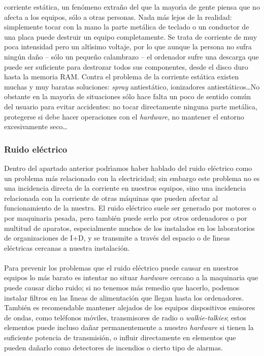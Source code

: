 corriente est\'atica, un fen\'omeno extra\~no del que la mayor\'{\i}a de gente
piensa que no afecta a los equipos, s\'olo a otras personas. Nada m\'as lejos
de la realidad: simplemente tocar con la mano la parte met\'alica de teclado o 
un conductor de una placa puede destruir un equipo completamente. Se trata de
corriente de muy poca intensidad pero un alt\'{\i}simo voltaje, por lo que 
aunque la persona no sufra ning\'un da\~no -- s\'olo un peque\~no calambrazo --
el ordenador sufre una descarga que puede ser suficiente para destrozar todos
sus componentes, desde el disco duro hasta la memoria RAM. Contra el problema
de la corriente est\'atica existen muchas y muy baratas soluciones: {\it spray}
antiest\'atico, ionizadores antiest\'aticos\ldots No obstante en la mayor\'{\i}a
de situaciones s\'olo hace falta un poco de sentido com\'un del usuario para
evitar accidentes: no tocar directamente ninguna parte met\'alica, protegerse
si debe hacer operaciones con el {\it hardware}, no mantener el entorno 
excesivamente seco\ldots
\subsubsection{Ruido el\'ectrico}
Dentro del apartado anterior podr\'{\i}amos haber hablado del ruido el\'ectrico
como un problema m\'as relacionado con la electricidad; sin embargo este 
problema no es una incidencia directa de la corriente en nuestros equipos, sino
una incidencia relacionada con la corriente de otras m\'aquinas que pueden 
afectar al funcionamiento de la nuestra. El ruido el\'ectrico suele ser 
generado por motores o por maquinaria pesada, pero tambi\'en puede serlo por
otros ordenadores o por multitud de aparatos, especialmente muchos de los 
instalados en los laboratorios de
organizaciones de I+D, y se transmite a trav\'es del espacio o de l\'{\i}neas
el\'ectricas cercanas a nuestra instalaci\'on.\\
\\Para prevenir los problemas que el ruido el\'ectrico puede causar en nuestros
equipos lo m\'as barato es intentar no situar {\it hardware} cercano a la
maquinaria que puede causar dicho ruido; si no tenemos m\'as remedio que 
hacerlo, podemos instalar filtros en las l\'{\i}neas de alimentaci\'on que 
llegan hasta los ordenadores. Tambi\'en es recomendable mantener alejados de
los equipos dispositivos emisores de ondas, como tel\'efonos m\'oviles, 
transmisores de radio o {\it walkie-talkies}; estos elementos puede incluso
da\~nar permanentemente a nuestro {\it hardware} si tienen la suficiente 
potencia de transmisi\'on, o influir directamente en elementos que pueden 
da\~narlo como detectores de incendios o cierto tipo de alarmas.
